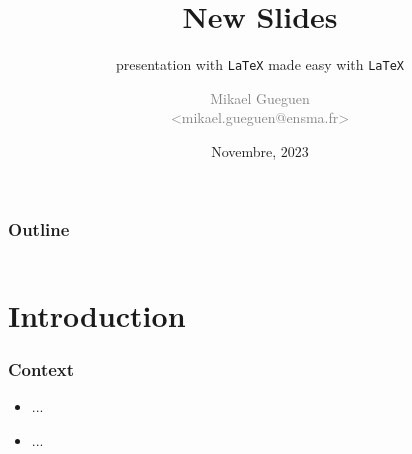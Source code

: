 \documentclass[aspectratio=169,utf8]{beamer}
\title[Beamer Slides]{\centering New Slides }
\subtitle{presentation with \texttt{\LaTeX} made easy with \texttt{\LaTeX} }
\author[MG]{\scriptsize \textcolor{gray}{Mikael Gueguen\\ <mikael.gueguen@ensma.fr>}}
\date{Novembre, $2023$}
\begin{document}
\addtocounter{framenumber}{-1}


\begin{frame}
  \titlepage
\end{frame}

\begin{frame}
  \frametitle{Outline}

  \centering

  \begin{minipage}{.75\textwidth}

    \begin{columns}[t]
      \begin{column}{.5\textwidth}
        \tableofcontents[sections={1-5}]
      \end{column}
      \begin{column}{.5\textwidth}
        \tableofcontents[sections={6-10}]
      \end{column}
    \end{columns}

  \end{minipage}

\end{frame}


\section{Introduction}

\begin{frame}
  \frametitle{Context}

  \begin{itemize}
    \setlength{\itemsep}{8pt}
    	\item ...
	\item ...
  \end{itemize}

\end{frame}
\end{document}
